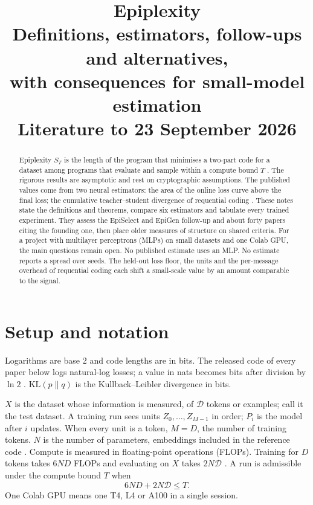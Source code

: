 \documentclass[11pt]{article}
\title{\textbf{Epiplexity}\\[0.3em]
\large Definitions, estimators, follow-ups and alternatives,\\ with consequences for small-model estimation\\[0.3em]
\normalsize Literature to 23 September 2026}
\date{}\author{}
\newcommand{\Dt}{\mathcal{D}}\newcommand{\PT}{\mathcal{P}_T}\newcommand{\prog}{\mathrm{P}}
\newcommand{\KL}{\mathrm{KL}}\newcommand{\MDL}{\mathrm{MDL}}\newcommand{\Poly}{\mathrm{Poly}}
\theoremstyle{tight}
\begin{document}
\maketitle\vspace{-3em}

\begin{abstract}\noindent
Epiplexity $S_T$ is the length of the program that minimises a two-part code for a dataset among
programs that evaluate and sample within a compute bound $T$ \citep{finzi2026epiplexity}. The
rigorous results are asymptotic and rest on cryptographic assumptions. The published values come
from two neural estimators: the area of the online loss curve above the final loss; the cumulative
teacher--student divergence of requential coding \citep{qiu2026requential}. These notes state the
definitions and theorems, compare six estimators and tabulate every trained experiment. They assess
the EpiSelect and EpiGen follow-up \citep{su2026epiplexity} and about forty papers citing the founding
one, then place older measures of structure on shared criteria. For a project with multilayer
perceptrons (MLPs) on small datasets and one Colab GPU, the main questions remain open. No published
estimate uses an MLP. No estimate reports a spread over seeds. The held-out loss floor, the units and
the per-message overhead of requential coding each shift a small-scale value by an amount comparable
to the signal.
\end{abstract}

\section{Setup and notation}\label{sec:setup}
Logarithms are base 2 and code lengths are in bits. The released code of every paper below logs
natural-log losses; a value in nats becomes bits after division by $\ln 2$
\citep{epiplexitycode,requentialcode}. $\KL(p\|q)$ is the Kullback--Leibler divergence in bits.

$X$ is the dataset whose information is measured, of $\Dt$ tokens or examples;
\citet{finzi2026epiplexity} call it the test dataset. A training run sees units $Z_0,\dots,Z_{M-1}$
in order; $P_i$ is the model after $i$ updates. When every unit is a token, $M=D$, the number of
training tokens. $N$ is the number of parameters, embeddings included in the reference code
\citep{epiplexitycode}. Compute is measured in floating-point operations (FLOPs). Training for $D$
tokens takes $6ND$ FLOPs and evaluating on $X$ takes $2N\Dt$ \citep{finzi2026epiplexity}. A run is
admissible under the compute bound $T$ when
\begin{equation}\label{eq:T}
6ND+2N\Dt\le T .
\end{equation}
One Colab GPU means one T4, L4 or A100 in a single session.
\end{document}
